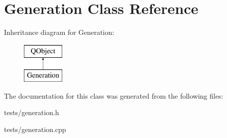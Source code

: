 \hypertarget{classGeneration}{}\section{Generation Class Reference}
\label{classGeneration}
Inheritance diagram for Generation\+:\begin{figure}[H]
\begin{center}
\leavevmode
\includegraphics[height=2.000000cm]{d4/df7/classGeneration}
\end{center}
\end{figure}


The documentation for this class was generated from the following files\+:\begin{DoxyCompactItemize}
\item 
tests/generation.\+h\item 
tests/generation.\+cpp\end{DoxyCompactItemize}
